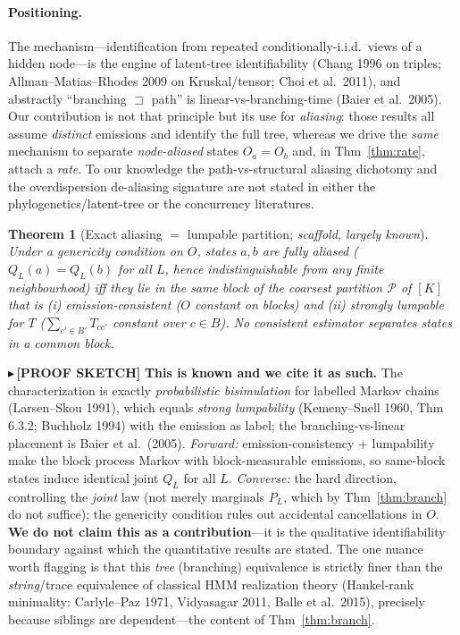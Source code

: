 \documentclass[11pt]{article}
\newtheorem{theorem}{Theorem}
\newcommand{\SKETCH}[1]{{\color{orange}\small$\blacktriangleright$\,\textbf{[PROOF SKETCH]} #1}}
\begin{document}
\paragraph{Positioning.} The mechanism---identification from repeated conditionally-i.i.d.\ views of a hidden
node---is the engine of latent-tree identifiability (Chang 1996 on triples; Allman--Matias--Rhodes 2009 on
Kruskal/tensor; Choi et al.\ 2011), and abstractly ``branching $\sqsupset$ path'' is linear-vs-branching-time
(Baier et al.\ 2005). Our contribution is not that principle but its use for \emph{aliasing}: those results all
assume \emph{distinct} emissions and identify the full tree, whereas we drive the \emph{same} mechanism to
separate \emph{node-aliased} states $O_a=O_b$ and, in Thm~\ref{thm:rate}, attach a \emph{rate}. To our knowledge
the path-vs-structural aliasing dichotomy and the overdispersion de-aliasing signature are not stated in either
the phylogenetics/latent-tree or the concurrency literatures.

\begin{theorem}[Exact aliasing $=$ lumpable partition; \emph{scaffold, largely known}]\label{thm:lump}
Under a genericity condition on $O$, states $a,b$ are \emph{fully aliased} ($Q_L(a)=Q_L(b)$ for all $L$, hence
indistinguishable from any finite neighbourhood) iff they lie in the same block of the coarsest partition
$\mathcal P$ of $[K]$ that is (i) \emph{emission-consistent} ($O$ constant on blocks) and (ii) \emph{strongly
lumpable} for $T$ ($\sum_{c'\in B'}T_{cc'}$ constant over $c\in B$). No consistent estimator separates states in a
common block.
\end{theorem}
\SKETCH{\textbf{This is known and we cite it as such.} The characterization is exactly \emph{probabilistic
bisimulation} for labelled Markov chains (Larsen--Skou 1991), which equals \emph{strong lumpability}
(Kemeny--Snell 1960, Thm 6.3.2; Buchholz 1994) with the emission as label; the branching-vs-linear placement is
Baier et al.\ (2005). \emph{Forward:} emission-consistency $+$ lumpability make the block process Markov with
block-measurable emissions, so same-block states induce identical joint $Q_L$ for all $L$. \emph{Converse:} the
hard direction, controlling the \emph{joint} law (not merely marginals $P_L$, which by Thm~\ref{thm:branch} do not
suffice); the genericity condition rules out accidental cancellations in $O$. \textbf{We do not claim this as a
contribution}---it is the qualitative identifiability boundary against which the quantitative results are stated.
The one nuance worth flagging is that this \emph{tree} (branching) equivalence is strictly finer than the
\emph{string}/trace equivalence of classical HMM realization theory (Hankel-rank minimality: Carlyle--Paz 1971,
Vidyasagar 2011, Balle et al.\ 2015), precisely because siblings are dependent---the content of
Thm~\ref{thm:branch}.}
\end{document}
